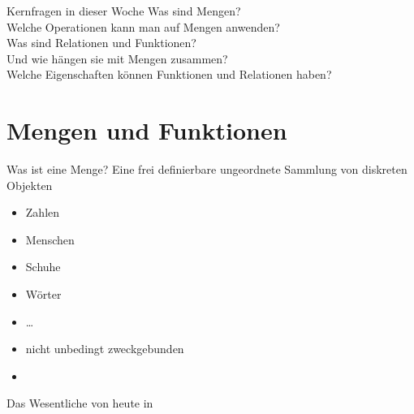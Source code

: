 \begin{frame}
  {Kernfragen in dieser Woche}
  \onslide<+->
  \onslide<+->
  \centering 
  \Large
  Was sind \alert{Mengen}?\\
  \Halbzeile
  \onslide<+->
  Welche Operationen kann man auf Mengen anwenden?\\
  \onslide<+->
  \Halbzeile
  Was sind \alert{Relationen} und \alert{Funktionen}?\\
  Und wie hängen sie mit Mengen zusammen?\\
  \onslide<+->
  \Halbzeile
  Welche Eigenschaften können Funktionen und Relationen haben?
\end{frame}

\section{Mengen und Funktionen}

\begin{frame}
  {Was ist eine Menge?}
  \onslide<+->
  \onslide<+->
  Eine \alert{frei definierbare ungeordnete Sammlung von diskreten Objekten}\\
  \begin{itemize}[<+->]
    \item Zahlen
    \item Menschen
    \item Schuhe
    \item Wörter
    \item \ldots
      \Halbzeile
    \item nicht unbedingt zweckgebunden
    \item {}
  \end{itemize}
  \centering
  \Zeile
  \onslide<+->
  Das Wesentliche von heute in \citet[Kapitel~1--4]{ParteeEa1990}
\end{frame}

